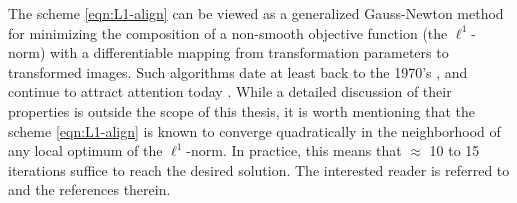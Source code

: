 The scheme \eqref{eqn:L1-align} can be viewed as a generalized Gauss-Newton
method for minimizing the composition of a non-smooth objective function (the
$\ell^1$-norm) with a differentiable mapping from transformation parameters to
transformed images. Such algorithms date at least back to the 1970's
\cite{Cromme1978-NM,Jittorntrum1980-NM}, and continue to attract attention
today \cite{Lewis2008-TR}. While a detailed discussion of their properties is
outside the scope of this thesis, it is worth mentioning that the scheme
\eqref{eqn:L1-align} is known to converge quadratically in the neighborhood of
any local optimum of the $\ell^1$-norm. In practice, this means that $\approx$
10 to 15 iterations suffice to reach the desired solution. The
interested reader is referred to \cite{Jittorntrum1980-NM,Osborne1990-JAMSSB} and the
references therein.

